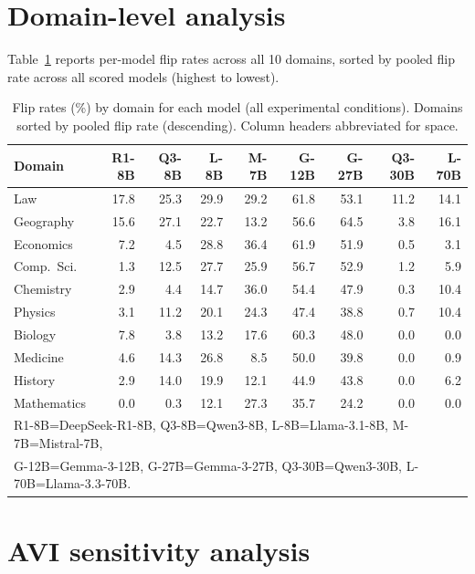 \documentclass{article}
\newcommand{\avi}{\textsc{AVI}}
\begin{document}
\section{Domain-level analysis}
\label{app:domains}

Table~\ref{tab:domains_permodel} reports per-model flip rates across all 10 domains, sorted by pooled flip rate across all scored models (highest to lowest).

\begin{table}[h]
\centering
\caption{Flip rates (\%) by domain for each model (all experimental conditions). Domains sorted by pooled flip rate (descending). Column headers abbreviated for space.}
\label{tab:domains_permodel}
\small
\begin{tabular}{lrrrrrrrr}
\toprule
\textbf{Domain} & \textbf{R1-8B} & \textbf{Q3-8B} & \textbf{L-8B} & \textbf{M-7B} & \textbf{G-12B} & \textbf{G-27B} & \textbf{Q3-30B} & \textbf{L-70B} \\
\midrule
Law          & 17.8 & 25.3 & 29.9 & 29.2 & 61.8 & 53.1 & 11.2 & 14.1 \\
Geography    & 15.6 & 27.1 & 22.7 & 13.2 & 56.6 & 64.5 &  3.8 & 16.1 \\
Economics    &  7.2 &  4.5 & 28.8 & 36.4 & 61.9 & 51.9 &  0.5 &  3.1 \\
Comp.\ Sci.  &  1.3 & 12.5 & 27.7 & 25.9 & 56.7 & 52.9 &  1.2 &  5.9 \\
Chemistry    &  2.9 &  4.4 & 14.7 & 36.0 & 54.4 & 47.9 &  0.3 & 10.4 \\
Physics      &  3.1 & 11.2 & 20.1 & 24.3 & 47.4 & 38.8 &  0.7 & 10.4 \\
Biology      &  7.8 &  3.8 & 13.2 & 17.6 & 60.3 & 48.0 &  0.0 &  0.0 \\
Medicine     &  4.6 & 14.3 & 26.8 &  8.5 & 50.0 & 39.8 &  0.0 &  0.9 \\
History      &  2.9 & 14.0 & 19.9 & 12.1 & 44.9 & 43.8 &  0.0 &  6.2 \\
Mathematics  &  0.0 &  0.3 & 12.1 & 27.3 & 35.7 & 24.2 &  0.0 &  0.0 \\
\bottomrule
\multicolumn{9}{l}{\small R1-8B=DeepSeek-R1-8B, Q3-8B=Qwen3-8B, L-8B=Llama-3.1-8B, M-7B=Mistral-7B,} \\
\multicolumn{9}{l}{\small G-12B=Gemma-3-12B, G-27B=Gemma-3-27B, Q3-30B=Qwen3-30B, L-70B=Llama-3.3-70B.} \\
\end{tabular}
\end{table}

\section{\avi{} sensitivity analysis}
\label{app:avi_sensitivity}
\end{document}
